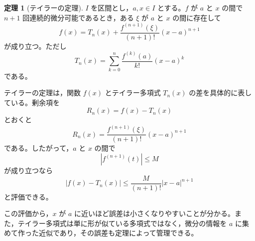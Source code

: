 \documentclass[a4paper,12pt]{jsarticle}
\theoremstyle{definition}
\newtheorem*{theorem}{定理}
\begin{document}
\begin{theorem}[テイラーの定理]
$I$ を区間とし，$a,x\in I$ とする。$f$ が $a$ と $x$ の間で $n+1$ 回連続的微分可能であるとき，ある $\xi$ が $a$ と $x$ の間に存在して
\[
f(x)=T_n(x)+\frac{f^{(n+1)}(\xi)}{(n+1)!}(x-a)^{n+1}
\]
が成り立つ。ただし
\[
T_n(x)=\sum_{k=0}^{n}\frac{f^{(k)}(a)}{k!}(x-a)^k
\]
である。
\end{theorem}

テイラーの定理は，関数 $f(x)$ とテイラー多項式 $T_n(x)$ の差を具体的に表している。剰余項を
\[
R_n(x)=f(x)-T_n(x)
\]
とおくと
\[
R_n(x)=\frac{f^{(n+1)}(\xi)}{(n+1)!}(x-a)^{n+1}
\]
である。したがって，$a$ と $x$ の間で
\[
|f^{(n+1)}(t)|\leq M
\]
が成り立つなら
\[
|f(x)-T_n(x)|\leq \frac{M}{(n+1)!}|x-a|^{n+1}
\]
と評価できる。

この評価から，$x$ が $a$ に近いほど誤差は小さくなりやすいことが分かる。また，テイラー多項式は単に形が似ている多項式ではなく，微分の情報を $a$ に集めて作った近似であり，その誤差も定理によって管理できる。
\end{document}
